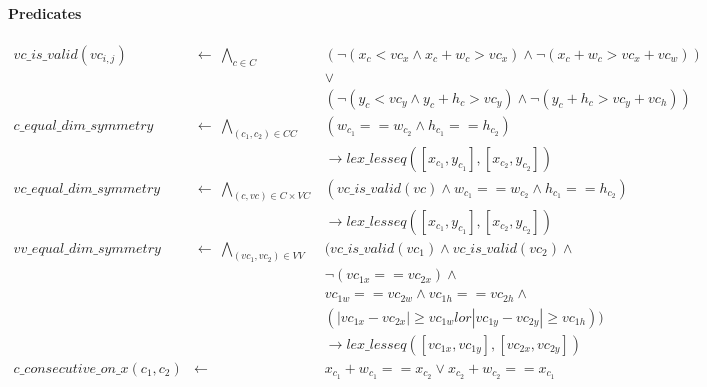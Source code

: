     \paragraph{Predicates}
    \begin{align*}
        vc\_is\_valid(vc_{i,j})     &\leftarrow\    \bigwedge_{c \in C} &  (\neg(x_c < vc_x \land x_c + w_c > vc_x) \land
                                                    \neg(x_c + w_c > vc_x + vc_w))                                  \\
                                                &&  \lor                                             \\
                                                &&  (\neg(y_c < vc_y \land y_c + h_c > vc_y) \land
                                                    \neg(y_c + h_c > vc_y + vc_h))                                  \\
        c\_equal\_dim\_symmetry &\leftarrow\        \bigwedge_{(c_1, c_2) \in CC} & (w_{c_1} == w_{c_2} \land h_{c_1} == h_{c_2})                   \\
                                                &&  \rightarrow lex\_lesseq([x_{c_1}, y_{c_1}], [x_{c_2}, y_{c_2}]) \\ 
        vc\_equal\_dim\_symmetry &\leftarrow\       \bigwedge_{(c, vc) \in C \times VC} & (vc\_is\_valid(vc) \land w_{c_1} == w_{c_2} \land h_{c_1} == h_{c_2})   \\
                                                &&  \rightarrow lex\_lesseq([x_{c_1}, y_{c_1}], [x_{c_2}, y_{c_2}])     \\      
        vv\_equal\_dim\_symmetry &\leftarrow\       \bigwedge_{(vc_1, vc_2) \in VV}
                                                &   (vc\_is\_valid(vc_1) \land vc\_is\_valid(vc_2) \land                         \\
                                                &&  \neg (vc_{1x} == vc_{2x}) \land \\
                                                &&  vc_{1w} == vc_{2w} \land vc_{1h} == vc_{2h} \land \\
                                                &&  (|vc_{1x} - vc_{2x}| \geq vc_{1w} lor |vc_{1y} - vc_{2y}| \geq vc_{1h})) \\
                                                &&  \rightarrow lex\_lesseq([vc_{1x}, vc_{1y}], [vc_{2x}, vc_{2y}]) \\
        c\_consecutive\_on\_x(c_1, c_2) &\leftarrow  &   x_{c_1} + w_{c_1} == x_{c_2} \lor x_{c_2} + w_{c_2} == x_{c_1} \\

\end{align*}
